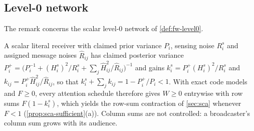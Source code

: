 \subsection{Level-0 network}\label{sup:fw-level-0-network}

The remark concerns the scalar level-0 network of \cref{def:fw-level0}.

\begin{remark}\label{rem:fw-convex-gains}
A scalar literal receiver with claimed prior variance $P_i$, sensing noise $R^s_i$ and assigned message noises $\hat R_{ij}$ has claimed posterior variance $P^+_i=\bigl(P_i^{-1}+(H^s_i)^2/R^s_i+\sum_j\hat H_{ij}^2/\hat R_{ij}\bigr)^{-1}$ and gains $k^s_i=P^+_i(H^s_i)^2/R^s_i$ and $k_{ij}=P^+_i\hat H_{ij}^2/\hat R_{ij}$, so that $k^s_i+\sum_jk_{ij}=1-P^+_i/P_i<1$. With exact code models and $F\ge0$, every attention schedule therefore gives $W\ge0$ entrywise with row sums $F(1-k^s_i)$, which yields the row-sum contraction of \cref{sec:sca} whenever $F<1$ (\cref{prop:sca-sufficient}(a)). Column sums are not controlled: a broadcaster's column sum grows with its audience.
\end{remark}
